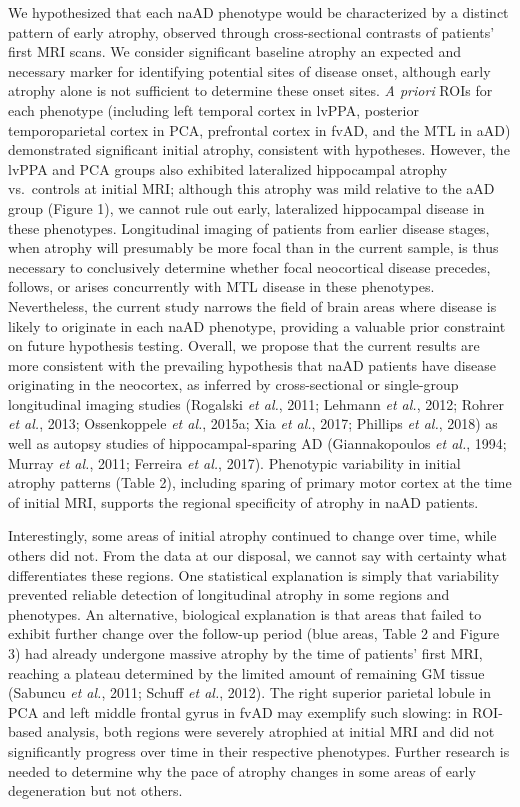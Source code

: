 \documentclass[]{article}
\begin{document}
We hypothesized that each naAD phenotype would be characterized by a
distinct pattern of early atrophy, observed through cross-sectional
contrasts of patients' first MRI scans. We consider significant baseline
atrophy an expected and necessary marker for identifying potential sites
of disease onset, although early atrophy alone is not sufficient to
determine these onset sites. \emph{A priori} ROIs for each phenotype
(including left temporal cortex in lvPPA, posterior temporoparietal
cortex in PCA, prefrontal cortex in fvAD, and the MTL in aAD)
demonstrated significant initial atrophy, consistent with hypotheses.
However, the lvPPA and PCA groups also exhibited lateralized hippocampal
atrophy vs.~controls at initial MRI; although this atrophy was mild
relative to the aAD group (Figure 1), we cannot rule out early,
lateralized hippocampal disease in these phenotypes. Longitudinal
imaging of patients from earlier disease stages, when atrophy will
presumably be more focal than in the current sample, is thus necessary
to conclusively determine whether focal neocortical disease precedes,
follows, or arises concurrently with MTL disease in these phenotypes.
Nevertheless, the current study narrows the field of brain areas where
disease is likely to originate in each naAD phenotype, providing a
valuable prior constraint on future hypothesis testing. Overall, we
propose that the current results are more consistent with the prevailing
hypothesis that naAD patients have disease originating in the neocortex,
as inferred by cross-sectional or single-group longitudinal imaging
studies (Rogalski \emph{et al.}, 2011; Lehmann \emph{et al.}, 2012;
Rohrer \emph{et al.}, 2013; Ossenkoppele \emph{et al.}, 2015a; Xia
\emph{et al.}, 2017; Phillips \emph{et al.}, 2018) as well as autopsy
studies of hippocampal-sparing AD (Giannakopoulos \emph{et al.}, 1994;
Murray \emph{et al.}, 2011; Ferreira \emph{et al.}, 2017). Phenotypic
variability in initial atrophy patterns (Table 2), including sparing of
primary motor cortex at the time of initial MRI, supports the regional
specificity of atrophy in naAD patients.

Interestingly, some areas of initial atrophy continued to change over
time, while others did not. From the data at our disposal, we cannot say
with certainty what differentiates these regions. One statistical
explanation is simply that variability prevented reliable detection of
longitudinal atrophy in some regions and phenotypes. An alternative,
biological explanation is that areas that failed to exhibit further
change over the follow-up period (blue areas, Table 2 and Figure 3) had
already undergone massive atrophy by the time of patients' first MRI,
reaching a plateau determined by the limited amount of remaining GM
tissue (Sabuncu \emph{et al.}, 2011; Schuff \emph{et al.}, 2012). The
right superior parietal lobule in PCA and left middle frontal gyrus in
fvAD may exemplify such slowing: in ROI-based analysis, both regions
were severely atrophied at initial MRI and did not significantly
progress over time in their respective phenotypes. Further research is
needed to determine why the pace of atrophy changes in some areas of
early degeneration but not others.
\end{document}
